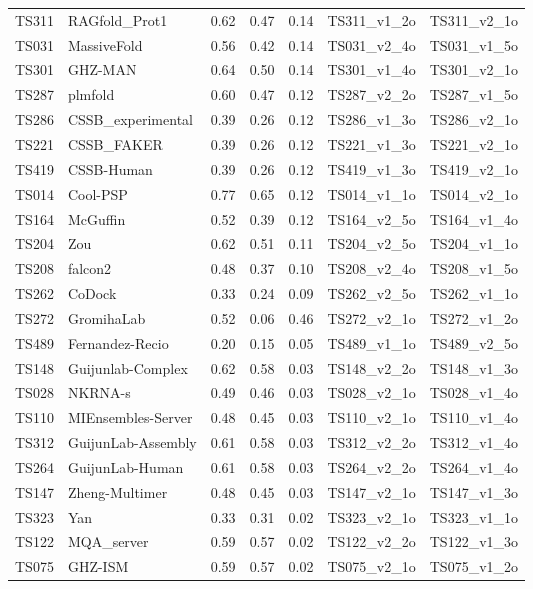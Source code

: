 \begin{longtable}{lllllll}
TS311 & RAGfold\_Prot1 & 0.62 & 0.47 & 0.14 & TS311\_v1\_2o & TS311\_v2\_1o \\ 
TS031 & MassiveFold & 0.56 & 0.42 & 0.14 & TS031\_v2\_4o & TS031\_v1\_5o \\ 
TS301 & GHZ-MAN & 0.64 & 0.50 & 0.14 & TS301\_v1\_4o & TS301\_v2\_1o \\ 
TS287 & plmfold & 0.60 & 0.47 & 0.12 & TS287\_v2\_2o & TS287\_v1\_5o \\ 
TS286 & CSSB\_experimental & 0.39 & 0.26 & 0.12 & TS286\_v1\_3o & TS286\_v2\_1o \\ 
TS221 & CSSB\_FAKER & 0.39 & 0.26 & 0.12 & TS221\_v1\_3o & TS221\_v2\_1o \\ 
TS419 & CSSB-Human & 0.39 & 0.26 & 0.12 & TS419\_v1\_3o & TS419\_v2\_1o \\ 
TS014 & Cool-PSP & 0.77 & 0.65 & 0.12 & TS014\_v1\_1o & TS014\_v2\_1o \\ 
TS164 & McGuffin & 0.52 & 0.39 & 0.12 & TS164\_v2\_5o & TS164\_v1\_4o \\ 
TS204 & Zou & 0.62 & 0.51 & 0.11 & TS204\_v2\_5o & TS204\_v1\_1o \\ 
TS208 & falcon2 & 0.48 & 0.37 & 0.10 & TS208\_v2\_4o & TS208\_v1\_5o \\ 
TS262 & CoDock & 0.33 & 0.24 & 0.09 & TS262\_v2\_5o & TS262\_v1\_1o \\ 
TS272 & GromihaLab & 0.52 & 0.06 & 0.46 & TS272\_v2\_1o & TS272\_v1\_2o \\ 
TS489 & Fernandez-Recio & 0.20 & 0.15 & 0.05 & TS489\_v1\_1o & TS489\_v2\_5o \\ 
TS148 & Guijunlab-Complex & 0.62 & 0.58 & 0.03 & TS148\_v2\_2o & TS148\_v1\_3o \\ 
TS028 & NKRNA-s & 0.49 & 0.46 & 0.03 & TS028\_v2\_1o & TS028\_v1\_4o \\ 
TS110 & MIEnsembles-Server & 0.48 & 0.45 & 0.03 & TS110\_v2\_1o & TS110\_v1\_4o \\ 
TS312 & GuijunLab-Assembly & 0.61 & 0.58 & 0.03 & TS312\_v2\_2o & TS312\_v1\_4o \\ 
TS264 & GuijunLab-Human & 0.61 & 0.58 & 0.03 & TS264\_v2\_2o & TS264\_v1\_4o \\ 
TS147 & Zheng-Multimer & 0.48 & 0.45 & 0.03 & TS147\_v2\_1o & TS147\_v1\_3o \\ 
TS323 & Yan & 0.33 & 0.31 & 0.02 & TS323\_v2\_1o & TS323\_v1\_1o \\ 
TS122 & MQA\_server & 0.59 & 0.57 & 0.02 & TS122\_v2\_2o & TS122\_v1\_3o \\ 
TS075 & GHZ-ISM & 0.59 & 0.57 & 0.02 & TS075\_v2\_1o & TS075\_v1\_2o \\ 

\end{longtable}
